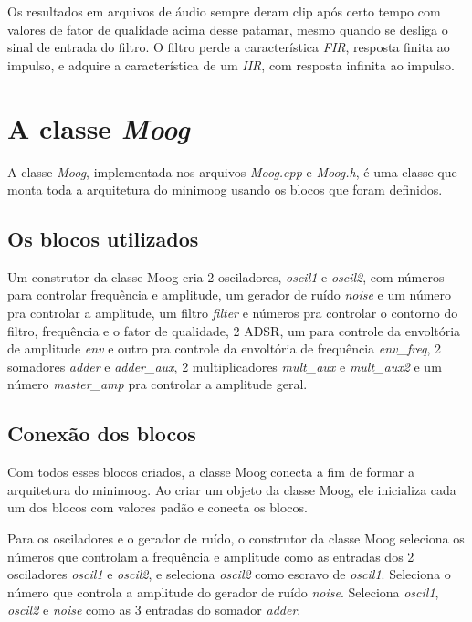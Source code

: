 \documentclass{article}
\begin{document}
Os resultados em arquivos de
áudio sempre deram clip após certo tempo com valores de fator de qualidade acima desse patamar, mesmo quando se desliga o sinal de entrada do filtro.
 O filtro perde a característica \emph{FIR}, resposta finita ao impulso, e adquire a característica de um \emph{IIR}, com resposta infinita ao impulso.



\section{A classe \emph{Moog}}


A classe \emph{Moog}, implementada nos arquivos \emph{Moog.cpp} e \emph{Moog.h}, é uma classe que monta toda a arquitetura do minimoog usando os blocos que foram definidos.

\subsection{Os blocos utilizados}
Um construtor da classe Moog cria 2 osciladores, \emph{oscil1} e \emph{oscil2}, com números para controlar frequência e amplitude, um gerador de ruído \emph{noise} 
e um número pra controlar a amplitude, um filtro \emph{filter} e números pra controlar o contorno do filtro, frequência e o fator de qualidade, 2 ADSR, um para controle da 
envoltória de amplitude \emph{env} e outro pra controle da envoltória de frequência \emph{env\_freq}, 2 somadores \emph{adder} e \emph{adder\_aux}, 2 multiplicadores
\emph{mult\_aux} e \emph{mult\_aux2} e um número \emph{master\_amp} pra controlar a amplitude geral.

\subsection{Conexão dos blocos}
Com todos esses blocos criados, a classe Moog conecta a fim de formar a arquitetura do minimoog. Ao criar um objeto da classe Moog, ele inicializa 
cada um dos blocos com valores padão e conecta os blocos.



Para os osciladores e o gerador de ruído, o construtor da classe Moog seleciona os números que controlam a frequência e amplitude como as entradas dos
2 osciladores \emph{oscil1} e \emph{oscil2}, e seleciona \emph{oscil2} como escravo de \emph{oscil1}. Seleciona o número que controla a amplitude do gerador de 
ruído \emph{noise}. Seleciona \emph{oscil1}, \emph{oscil2} e \emph{noise} como as 3 entradas do somador \emph{adder}. 
\end{document}
